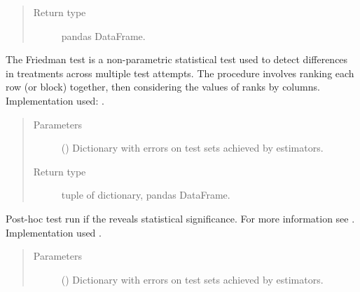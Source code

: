 \documentclass[letterpaper,10pt,english]{sphinxmanual}
\begin{document}
\begin{fulllineitems}
\begin{fulllineitems}
\begin{quote}
\begin{description}
\item[{Return type}] \leavevmode
pandas DataFrame.

\end{description}\end{quote}

\end{fulllineitems}


\begin{fulllineitems}
\label{\detokenize{analyze_results:mleap.analyze_results.analyze_results.AnalyseResults.friedman_test}}
The Friedman test is a non-parametric statistical test used to detect differences 
in treatments across multiple test attempts. The procedure involves ranking each row (or block) together, 
then considering the values of ranks by columns.
Implementation used: .
\begin{quote}\begin{description}
\item[{Parameters}] \leavevmode
{} () \textendash{} Dictionary with errors on test sets achieved by estimators.

\item[{Return type}] \leavevmode
tuple of dictionary, pandas DataFrame.

\end{description}\end{quote}

\end{fulllineitems}


\begin{fulllineitems}
\label{\detokenize{analyze_results:mleap.analyze_results.analyze_results.AnalyseResults.nemenyi}}
Post-hoc test run if the  reveals statistical significance.
For more information see .
Implementation used .
\begin{quote}\begin{description}
\item[{Parameters}] \leavevmode
{} () \textendash{} Dictionary with errors on test sets achieved by estimators.


\end{description}
\end{quote}
\end{fulllineitems}
\end{fulllineitems}
\end{document}
